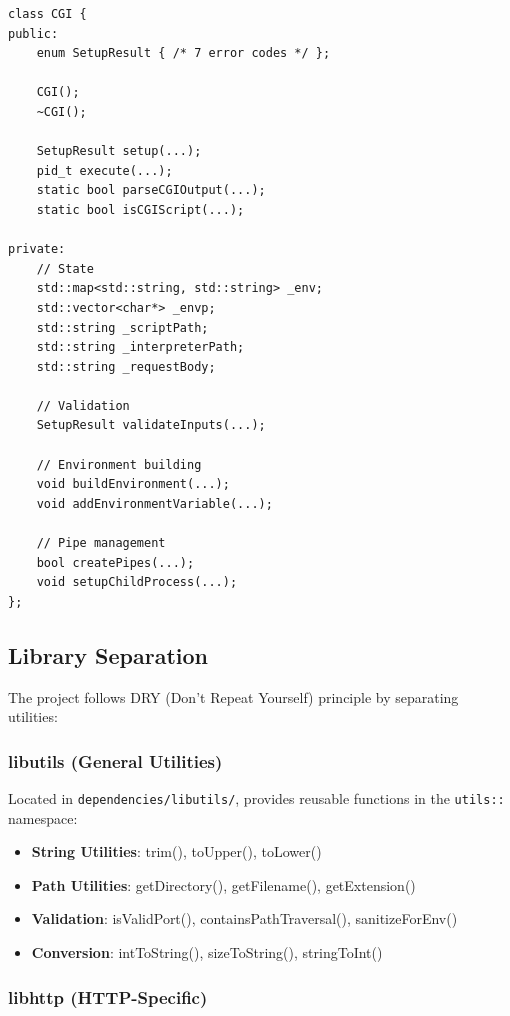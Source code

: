\documentclass[11pt,a4paper]{article}
\begin{document}
\begin{lstlisting}[caption=CGI Class Overview]
class CGI {
public:
    enum SetupResult { /* 7 error codes */ };
    
    CGI();
    ~CGI();
    
    SetupResult setup(...);
    pid_t execute(...);
    static bool parseCGIOutput(...);
    static bool isCGIScript(...);
    
private:
    // State
    std::map<std::string, std::string> _env;
    std::vector<char*> _envp;
    std::string _scriptPath;
    std::string _interpreterPath;
    std::string _requestBody;
    
    // Validation
    SetupResult validateInputs(...);
    
    // Environment building
    void buildEnvironment(...);
    void addEnvironmentVariable(...);
    
    // Pipe management
    bool createPipes(...);
    void setupChildProcess(...);
};
\end{lstlisting}

\subsection{Library Separation}

The project follows DRY (Don't Repeat Yourself) principle by separating utilities:

\subsubsection{libutils (General Utilities)}

Located in \texttt{dependencies/libutils/}, provides reusable functions in the \texttt{utils::} namespace:

\begin{itemize}
    \item \textbf{String Utilities}: trim(), toUpper(), toLower()
    \item \textbf{Path Utilities}: getDirectory(), getFilename(), getExtension()
    \item \textbf{Validation}: isValidPort(), containsPathTraversal(), sanitizeForEnv()
    \item \textbf{Conversion}: intToString(), sizeToString(), stringToInt()
\end{itemize}

\subsubsection{libhttp (HTTP-Specific)}
\end{document}
